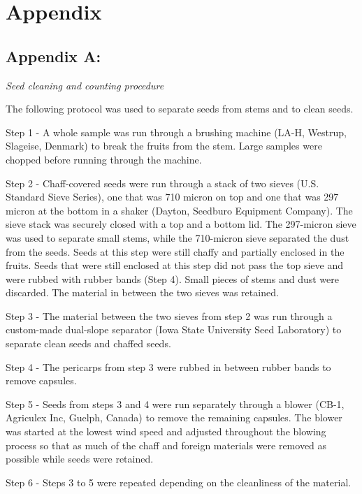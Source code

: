 \documentclass[utf8]{frontiersSCNS}
\begin{document}
\hypertarget{appendix}{%
\section*{Appendix}\label{appendix}}

\hypertarget{appendix-a}{
\subsection*{Appendix A:}\label{appendix-a}}

\emph{Seed cleaning and counting procedure}

The following protocol was used to separate seeds from stems and to clean seeds.

Step 1 - A whole sample was run through a brushing machine (LA-H, Westrup, Slageise, Denmark) to break the fruits from the stem. Large samples were chopped before running through the machine.

Step 2 - Chaff-covered seeds were run through a stack of two sieves (U.S. Standard Sieve Series), one that was 710 micron on top and one that was 297 micron at the bottom in a shaker (Dayton, Seedburo Equipment Company). The sieve stack was securely closed with a top and a bottom lid. The 297-micron sieve was used to separate small stems, while the 710-micron sieve separated the dust from the seeds. Seeds at this step were still chaffy and partially enclosed in the fruits. Seeds that were still enclosed at this step did not pass the top sieve and were rubbed with rubber bands (Step 4). Small pieces of stems and dust were discarded. The material in between the two sieves was retained.

Step 3 - The material between the two sieves from step 2 was run through a custom-made dual-slope separator (Iowa State University Seed Laboratory) to separate clean seeds and chaffed seeds.

Step 4 - The pericarps from step 3 were rubbed in between rubber bands to remove capsules.

Step 5 - Seeds from steps 3 and 4 were run separately through a blower (CB-1, Agriculex Inc, Guelph, Canada) to remove the remaining capsules. The blower was started at the lowest wind speed and adjusted throughout the blowing process so that as much of the chaff and foreign materials were removed as possible while seeds were retained.

Step 6 - Steps 3 to 5 were repeated depending on the cleanliness of the material.
\end{document}

